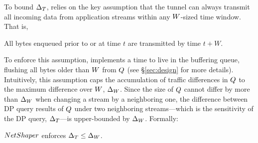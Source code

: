 To bound $\Delta_T$, {\sys} relies on the key assumption that
the tunnel can always transmit all incoming data from
application streams within any $W$-sized time window. That is,
\begin{assumption}\label{assumption:window}
All bytes enqueued prior to or at time $t$ are transmitted by time $t+W$.
\end{assumption}
To enforce this assumption, {\sys} implements a time to live in the buffering
queue, flushing all bytes older than $W$ from $Q$ (see
\S\ref{sec:design} for more details).
%
Intuitively, this assumption caps the accumulation of traffic differences in
$Q$ to the maximum difference over $W$, \ie $\Delta_{W}$.
Since the size of $Q$ cannot differ by more than $\Delta_{W}$ when changing a
stream by a neighboring one, the difference between DP query results of $Q$
under two neighboring streams---which is the sensitivity of the DP query,
$\Delta_T$---is upper-bounded by $\Delta_{W}$. Formally:

\begin{proposition}\label{prop:sensitivity}
    {${NetShaper}$} enforces $\Delta_T \leq \Delta_{W}$.
\end{proposition}

